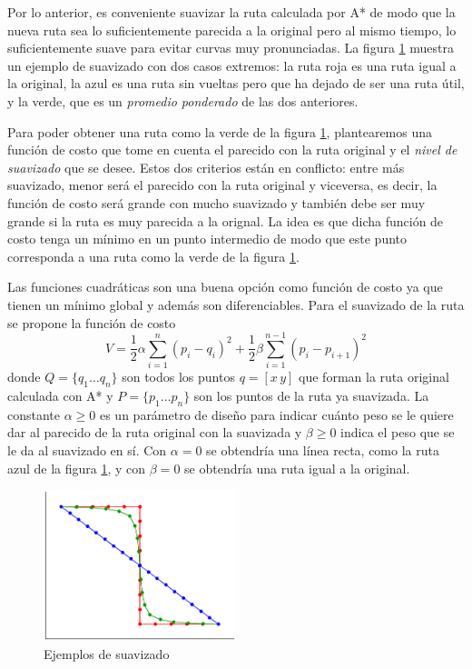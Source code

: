 \documentclass[letterpaper,12pt]{article}
\begin{document}
Por lo anterior, es conveniente suavizar la ruta calculada por A* de modo que la nueva ruta sea lo suficientemente parecida a la original pero al mismo tiempo, lo suficientemente suave para evitar curvas muy pronunciadas. La figura \ref{fig:Smooth} muestra un ejemplo de suavizado con dos casos extremos: la ruta roja es una ruta igual a la original, la azul es una ruta sin vueltas pero que ha dejado de ser una ruta útil, y la verde, que es un \textit{promedio ponderado} de las dos anteriores. 

Para poder obtener una ruta como la verde de la figura \ref{fig:Smooth}, plantearemos una función de costo que tome en cuenta el parecido con la ruta original y el \textit{nivel de suavizado} que se desee. Estos dos criterios están en conflicto: entre más suavizado, menor será el parecido con la ruta original y viceversa, es decir, la función de costo será grande con mucho suavizado y también debe ser muy grande si la ruta es muy parecida a la orignal. La idea es que dicha función de costo tenga un mínimo en un punto intermedio de modo que este punto corresponda a una ruta como la verde de la figura \ref{fig:Smooth}. 

Las funciones cuadráticas son una buena opción como función de costo ya que tienen un mínimo global y además son diferenciables. Para el suavizado de la ruta se propone la función de costo
\begin{equation}
V = \frac{1}{2}\alpha\sum_{i=1}^{n}\left(p_i - q_i\right)^2 + \frac{1}{2}\beta\sum_{i=1}^{n-1}\left(p_i - p_{i+1}\right)^2
\label{eq:Cost}
\end{equation}
donde $Q = \{q_1\dots q_n\}$ son todos los puntos $q = [x\,y]$ que forman la ruta original calculada con A* y $P=\{p_1\dots p_n\}$ son los puntos de la ruta ya suavizada. La constante $\alpha \geq 0$ es un parámetro de diseño para indicar cuánto peso se le quiere dar al parecido de la ruta original con la suavizada y $\beta \geq 0$ indica el peso que se le da al suavizado en sí. Con $\alpha = 0$ se obtendría una línea recta, como la ruta azul de la figura \ref{fig:Smooth}, y con $\beta = 0$ se obtendría una ruta igual a la original.

\begin{figure}
\centering
\includegraphics[width=0.5\textwidth]{Figures/Smooth.eps}
\caption{Ejemplos de suavizado}
\label{fig:Smooth}
\end{figure}
\end{document}
